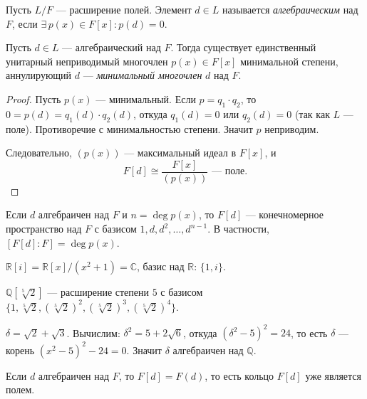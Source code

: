 \begin{definition}
    Пусть $L/F$ --- расширение полей. Элемент $d \in L$ называется \emph{алгебраическим} над $F$, если
    $\exists\, p(x) \in F[x]\colon p(d) = 0$.
\end{definition}


\begin{stmt}
    Пусть $d \in L$ --- алгебраический над $F$. Тогда существует единственный унитарный неприводимый многочлен
    $p(x) \in F[x]$ минимальной степени, аннулирующий $d$ --- \emph{минимальный многочлен} $d$ над $F
    $.

    \begin{proof}
        Пусть $p(x)$ --- минимальный. Если $p = q_1 \cdot q_2$, то $0 = p(d) = q_1(d) \cdot q_2(d)$, откуда
        $q_1(d) = 0$ или $q_2(d) = 0$ (так как $L$ --- поле). Противоречие с минимальностью степени. Значит
        $p$ неприводим.

        Следовательно, $(p(x))$ --- максимальный идеал в $F[x]$, и
        \[
            F[d] \cong \frac{F[x]}{(p(x))} \text{ --- поле.}
        \]
    \end{proof}
\end{stmt}


\begin{stmt}
    Если $d$ алгебраичен над $F$ и $n = \deg p(x)$, то $F[d]$ --- конечномерное пространство над $F$ с базисом
    $1, d, d^2, \dots, d^{n-1}$. В частности, $[F[d] : F] = \deg p(x)$.
\end{stmt}


\begin{examplelist}
    \item $\mathbb{R}[i] = \mathbb{R}[x]/(x^2 + 1) = \mathbb{C}$, базис над $\mathbb{R}$: $\{1, i\}$.


    \item $\mathbb{Q}[\sqrt[5]{2}]$ --- расширение степени $5$ с базисом $\{1, \sqrt[5]{2}, (\sqrt[5]
    {2})^2, (\sqrt[5]{2})^3, (\sqrt[5]{2})^4\}$.

    \item $\delta = \sqrt{2} + \sqrt{3}$. Вычислим: $\delta^2 = 5 + 2\sqrt{6}$, откуда $(\delta^2 - 5)
    ^2 = 24$, то есть $\delta$ --- корень $(x^2 - 5)^2 - 24 = 0$. Значит $\delta$ алгебраичен над $\mathbb{Q}
    $.
\end{examplelist}


\begin{stmt}
    Если $d$ алгебраичен над $F$, то $F[d] = F(d)$, то есть кольцо $F[d]$ уже является полем.
\end{stmt}

